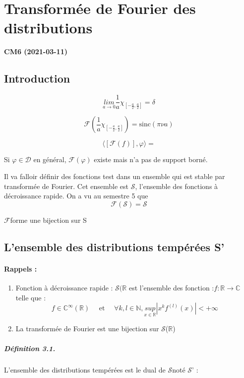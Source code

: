 \documentclass[12pt,a4paper]{report}
\newcommand{\ens}[1]{\ensuremath{\mathbb{#1}}}
\newcommand{\D}{\ensuremath{\mathcal{D}}}
\newcommand{\F}{\ensuremath{\mathcal{F}}}
\newcommand{\Sf}{\ensuremath{\mathcal{S}}}
\begin{document}
\chapter{Transformée de Fourier des distributions}

\begin{center}
\textbf{CM6 (2021-03-11)}
\end{center}

\section{Introduction}

\[
	\underset{a\rightarrow 0}{lim} \frac{1}{a}\chi_{[-\frac{a}{2}, \frac{a}{2}]} = \delta
\]

\[
	\F( \frac{1}{a}\chi_{[-\frac{a}{2}, \frac{a}{2}]}) = \text{sinc} (\pi \nu a)
\]

\[
	\langle [\F(f)], \varphi \rangle = 
\]

Si \(\varphi \in \D\) en général, \(\F(\varphi)\) existe mais n'a pas de support borné.

Il va falloir définir des fonctions test dans un ensemble qui est stable par transformée de Fourier.
Cet ensemble est \Sf, l'ensemble des fonctions à décroissance rapide. On a vu au semestre 5 que 
\[
	\F(\Sf) = \Sf
\]

\F forme une bijection sur S

\section{L'ensemble des distributions tempérées S'}

\subsubsection{Rappels :}

\begin{enumerate}
	\item Fonction à décroissance rapide : \(\Sf(\ens{R}\) est l'ensemble des fonction :\(f : \ens{R} \rightarrow \ens{C} \) telle que :
	\[
		f \in \ens{C}^\infty(\ens{R}) \quad \text{ et } \quad \forall k, l \in \ens{N}, \underset{x \in \ens{R}}{sup} | x^k f^{(l)}(x) | < +\infty
	\]
	\item La transformée de Fourier est une bijection sur \Sf(\ens{R})
\end{enumerate}

\paragraph{Définition 3.1.} L'ensemble des distributions tempérées est le dual de \Sf noté \Sf' :
\end{document}

